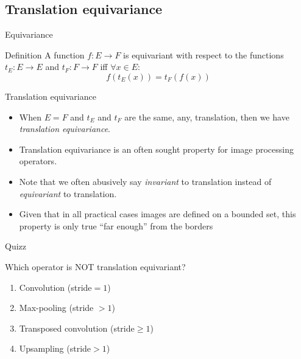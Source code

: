 \documentclass[xcolor=pdftex,dvipsnames,table,mathserif,aspectratio=169]{beamer}
\begin{document}
\subsection{Translation equivariance}

\begin{frame}{Equivariance}

\begin{block}{Definition}
  A function $f: E \longrightarrow F$ is \alert{equivariant} with respect to the functions $t_E: E \longrightarrow E$ and $t_F: F \longrightarrow F$ iff $\forall x \in E$:
  \[
  f(t_E(x)) = t_F(f(x))
  \]
\end{block}

\end{frame}

\begin{frame}{Translation equivariance}

\begin{itemize}
  \item When $E=F$ and $t_E$ and $t_F$ are the same, any, translation, then we have \emph{translation equivariance}.
\item Translation equivariance is an often sought property for image processing operators.
\item Note that we often abusively say \emph{invariant} to translation instead of \emph{equivariant} to translation.
\item Given that in all practical cases images are defined on a bounded set, this property is only true ``far enough'' from the borders
\end{itemize}

\end{frame}


\begin{frame}{Quizz}

  \begin{quizzblock}{Which operator is NOT translation equivariant?}
    \begin{enumerate}
    \item Convolution (stride$=1$)
    \item Max-pooling (stride $>1$)
    \item Transposed convolution (stride$\geq 1$)
    \item Upsampling (stride$>1$)
    \end{enumerate}
  \end{quizzblock}

\end{frame}
\end{document}
